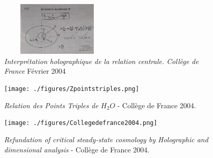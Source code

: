\documentclass[a4paper,12pt]{article}
\begin{document}
\begin{appendix}
\begin{figure}
\centering
\includegraphics[width=5.5cm,height=2.6cm]{./figures/Holotemperature.jpg}
\caption[Interprétation holographique de la relation centrale. College de France]{\textit{Interprétation holographique de la relation centrale. Collège de France} Février 2004}
\label{fig:20:figure20}
\end{figure}

\begin{figure}
\centering
\texttt{[image: ./figures/Zpointstriples.png]}
\caption[Relation des Points Triples de l eau]{\textit{Relation des Points Triples de $H_2O$} - Collège de France 2004.} 
\label{fig:21:figure21}
\end{figure}

\begin{figure}
\centering
\texttt{[image: ./figures/Collegedefrance2004.png]}
\caption[Holophysique presentation College de France 2004]{\textit{Refundation of critical steady-state cosmology by Holographic and dimensional analysis} - Collège de France 2004.} 
\label{fig:22:figure22}
\end{figure}






\end{appendix}
\end{document}
